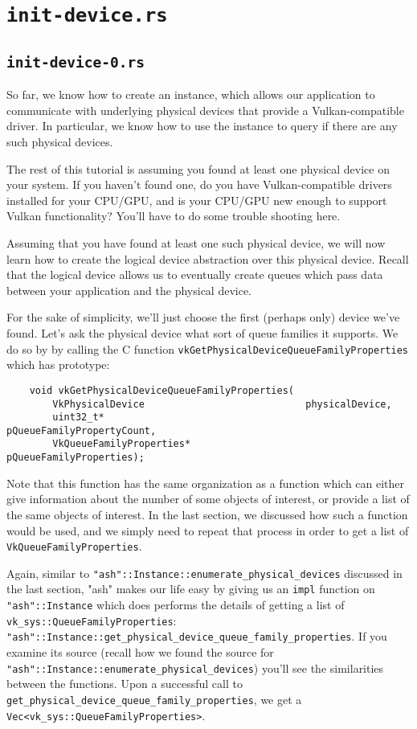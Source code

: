 \documentclass[12pt,letterpaper]{article}
\newcommand{\ril}[1]{\texttt{#1}}
\newcommand{\cil}[1]{\texttt{#1}}
\begin{document}
\section{\texttt{init-device.rs}}
	
	\subsection{\texttt{init-device-0.rs}}
		So far, we know how to create an instance, which allows our application to communicate with underlying physical devices that provide a Vulkan-compatible driver. In particular, we know how to use the instance to query if there are any such physical devices. 
		
		The rest of this tutorial is assuming you found at least one physical device on your system. If you haven't found one, do you have Vulkan-compatible drivers installed for your CPU/GPU, and is your CPU/GPU new enough to support Vulkan functionality? You'll have to do some trouble shooting here. 
		
		Assuming that you have found at least one such physical device, we will now learn how to create the logical device abstraction over this physical device. Recall that the logical device allows us to eventually create queues which pass data between your application and the physical device. 
		
		For the sake of simplicity, we'll just choose the first (perhaps only) device we've found. Let's ask the physical device what sort of queue families it supports. We do so by by calling the C function \cil{vkGetPhysicalDeviceQueueFamilyProperties} which has prototype:
			\begin{verbatim}
	void vkGetPhysicalDeviceQueueFamilyProperties(
		VkPhysicalDevice                            physicalDevice,
		uint32_t*                                   pQueueFamilyPropertyCount,
		VkQueueFamilyProperties*                    pQueueFamilyProperties);
			\end{verbatim}
		Note that this function has the same organization as a function which can either give information about the number of some objects of interest, or provide a list of the same objects of interest. In the last section, we discussed how such a function would be used, and we simply need to repeat that process in order to get a list of \cil{VkQueueFamilyProperties}.
		
		Again, similar to \ril{"ash"::Instance::enumerate_physical_devices} discussed in the last section, "ash" makes our life easy by giving us an \ril{impl} function on \ril{"ash"::Instance} which does performs the details of getting a list of \ril{vk_sys::QueueFamilyProperties}: \ril{"ash"::Instance::get_physical_device_queue_family_properties}. If you examine its source (recall how we found the source for \ril{"ash"::Instance::enumerate_physical_devices}) you'll see the similarities between the functions. Upon a successful call to \cil{get_physical_device_queue_family_properties}, we get a \ril{Vec<vk_sys::QueueFamilyProperties>}.
		
\end{document}
